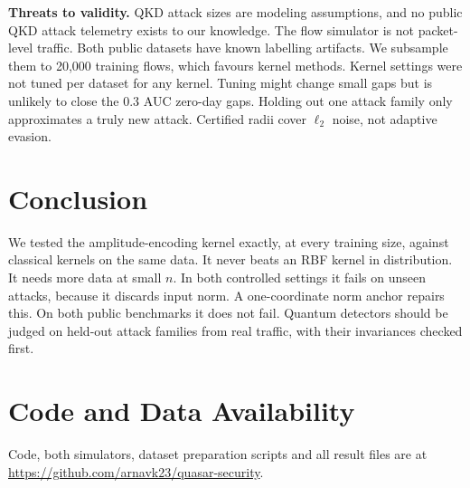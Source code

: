 \documentclass[journal]{IEEEtran}
\begin{document}
\textbf{Threats to validity.} QKD attack sizes are modeling assumptions, and no
public QKD attack telemetry exists to our knowledge. The flow simulator is not
packet-level traffic. Both public datasets have known labelling artifacts. We
subsample them to 20,000 training flows, which favours kernel methods. Kernel
settings were not tuned per dataset for any kernel. Tuning might change small gaps
but is unlikely to close the 0.3 AUC zero-day gaps. Holding out one attack family
only approximates a truly new attack. Certified radii cover $\ell_2$ noise, not
adaptive evasion.

\section{Conclusion}

We tested the amplitude-encoding kernel exactly, at every training size, against
classical kernels on the same data. It never beats an RBF kernel in distribution.
It needs more data at small $n$. In both controlled settings it fails on unseen
attacks, because it discards input norm. A one-coordinate norm anchor repairs
this. On both public benchmarks it does not fail. Quantum detectors should be
judged on held-out attack families from real traffic, with their invariances
checked first.

\section*{Code and Data Availability}
Code, both simulators, dataset preparation scripts and all result files are at
\url{https://github.com/arnavk23/quasar-security}.



\end{document}
